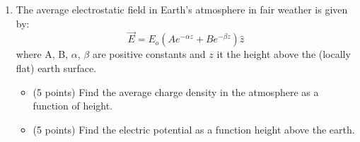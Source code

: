 \documentclass[12pt]{article}
\begin{document}
\begin{enumerate}
\begin{equation*}
\textit{\textcolor{red}{$S_x = \frac{\hbar}{2} $\begin{pmatrix}
$0$ & $1$ \\
$1$ & $0$
\end{pmatrix}$ $;}}
\hspace{0.2in}
\textit{\textcolor{purple}{$S_y = \frac{\hbar}{2} $\begin{pmatrix}
$0$ & $-i$ \\
$i$ & $0$
\end{pmatrix}$ $;}}
\hspace{0.2in}
\textit{\textcolor{Orange}{$S_z = \frac{\hbar}{2} $\begin{pmatrix}
$0$ & $-i$ \\
$i$ & $0$
\end{pmatrix}$ $;}}
\end{equation*}
\item The average electrostatic field in Earth's atmosphere in fair weather is given by:
\begin{equation}
\vec{E} = E_o (Ae^{-\alpha z} + Be^{-\beta z}) \hat{z}
\end{equation}
where A, B, $\alpha$, $\beta$ are positive constants and $z$ it the height above the (locally flat) earth surface.
\vskip0.2in
\begin{itemize}
    \item[(a)] (5 points) Find the average charge density in the atmosphere as a function of height.
    \vskip0.35in
    \item[(b)] (5 points) Find the electric potential as a function height above the earth.
\end{itemize}
\end{enumerate}
\end{document}
